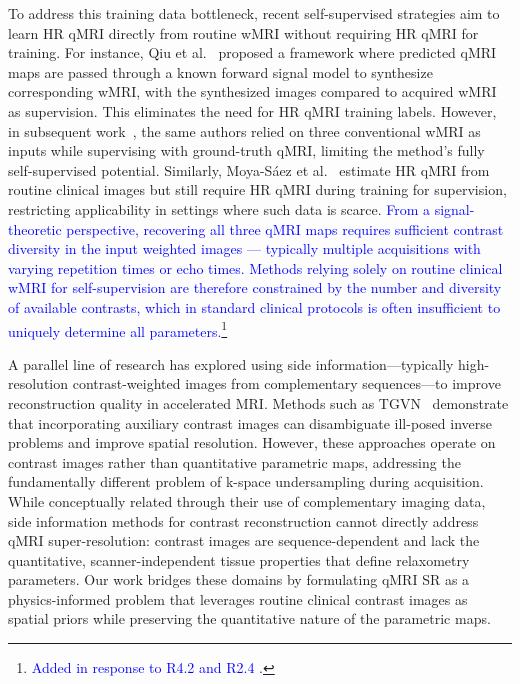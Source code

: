 \documentclass[journal,twoside,web]{ieeecolor}
\newcommand{\added}[1]{\textcolor{blue}{#1}}      %
\begin{document}
To address this training data bottleneck, recent self-supervised strategies aim to learn HR qMRI directly from routine wMRI without requiring HR qMRI for training. For instance, Qiu et al.~\cite{b5} proposed a framework where predicted qMRI maps are passed through a known forward signal model to synthesize corresponding wMRI, with the synthesized images compared to acquired wMRI as supervision. This eliminates the need for HR qMRI training labels. However, in subsequent work~\cite{b6}, the same authors relied on three conventional wMRI as inputs while supervising with ground-truth qMRI, limiting the method's fully self-supervised potential. Similarly, Moya-Sáez et al.~\cite{b7} estimate HR qMRI from routine clinical images but still require HR qMRI during training for supervision, restricting applicability in settings where such data is scarce. \added{From a signal-theoretic perspective, recovering all three qMRI maps requires sufficient contrast diversity in the input weighted images — typically multiple acquisitions with varying repetition times or echo times. Methods relying solely on routine clinical wMRI for self-supervision are therefore constrained by the number and diversity of available contrasts, which in standard clinical protocols is often insufficient to uniquely determine all parameters.\footnote{\textcolor{blue}{Added in response to R4.2 and R2.4 .}}}


A parallel line of research has explored using side information—typically high-resolution contrast-weighted images from complementary sequences—to improve reconstruction quality in accelerated MRI. Methods such as TGVN~\cite{b8} demonstrate that incorporating auxiliary contrast images can disambiguate ill-posed inverse problems and improve spatial resolution. However, these approaches operate on contrast images rather than quantitative parametric maps, addressing the fundamentally different problem of k-space undersampling during acquisition. While conceptually related through their use of complementary imaging data, side information methods for contrast reconstruction cannot directly address qMRI super-resolution: contrast images are sequence-dependent and lack the quantitative, scanner-independent tissue properties that define relaxometry parameters. Our work bridges these domains by formulating qMRI SR as a physics-informed problem that leverages routine clinical contrast images as spatial priors while preserving the quantitative nature of the parametric maps.
\end{document}
